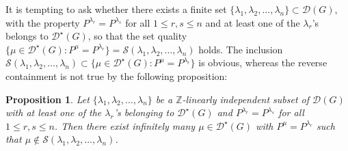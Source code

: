 \documentclass[11 pt]{amsart}
\newcommand{\Z}{{\mathbb Z}}
\newtheorem{proposition}[theorem]{Proposition}
\theoremstyle{definition}
\numberwithin{equation}{section}
\begin{document}
\noindent It is tempting to ask whether there exists a finite set $\{\lambda_1, \lambda_2, \dots ,\lambda_n\} \subset \mathcal{D}(G)$, with the property $P^{\lambda_r}=P^{\lambda_s}$ for all $1 \leq r,s \leq n$ and at least one of the $\lambda_r$'s belongs to $\mathcal{D}^{\star}(G)$, so that the set quality $\{ \mu \in \mathcal{D}^{\star}(G): P^{\mu}=P^{\lambda_r} \}=\mathcal{S}(\lambda_1, \lambda_2, \dots ,\lambda_n)$ holds. The inclusion $\mathcal{S}(\lambda_1, \lambda_2, \dots, \lambda_n) \subset \{ \mu \in \mathcal{D}^{\star}(G) : P^{\mu}=P^{\lambda_r} \}$ is obvious, whereas the reverse containment is not true by the following proposition: 

 \begin{proposition}\label{prop-exhaustion}
\textit{Let $\{ \lambda_1, \lambda_2, \dots , \lambda_n\}$ be a $\Z$-linearly independent subset of $\mathcal{D}(G)$ with at least one of the $\lambda_r$'s belonging to $\mathcal{D}^{\star}(G)$ and $P^{\lambda_r}=P^{\lambda_s}$ for all $1 \leq r,s \leq n$. Then there exist infinitely many $\mu \in \mathcal{D}^{\star}(G)$ with $P^{\mu}=P^{\lambda_r}$ such that $\mu \notin \mathcal{S}(\lambda_1, \lambda_2, \dots, \lambda_n)$.} 
\end{proposition}
\end{document}
